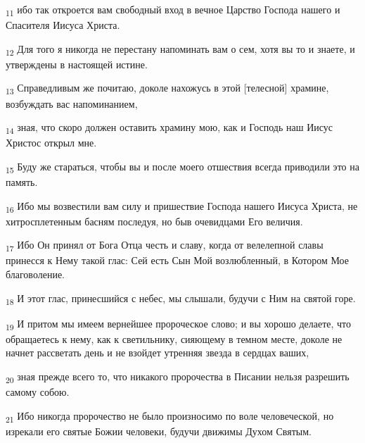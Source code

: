 \begin{tcolorbox}
\textsubscript{11} ибо так откроется вам свободный вход в вечное Царство Господа нашего и Спасителя Иисуса Христа.
\end{tcolorbox}
\begin{tcolorbox}
\textsubscript{12} Для того я никогда не перестану напоминать вам о сем, хотя вы то и знаете, и утверждены в настоящей истине.
\end{tcolorbox}
\begin{tcolorbox}
\textsubscript{13} Справедливым же почитаю, доколе нахожусь в этой [телесной] храмине, возбуждать вас напоминанием,
\end{tcolorbox}
\begin{tcolorbox}
\textsubscript{14} зная, что скоро должен оставить храмину мою, как и Господь наш Иисус Христос открыл мне.
\end{tcolorbox}
\begin{tcolorbox}
\textsubscript{15} Буду же стараться, чтобы вы и после моего отшествия всегда приводили это на память.
\end{tcolorbox}
\begin{tcolorbox}
\textsubscript{16} Ибо мы возвестили вам силу и пришествие Господа нашего Иисуса Христа, не хитросплетенным басням последуя, но быв очевидцами Его величия.
\end{tcolorbox}
\begin{tcolorbox}
\textsubscript{17} Ибо Он принял от Бога Отца честь и славу, когда от велелепной славы принесся к Нему такой глас: Сей есть Сын Мой возлюбленный, в Котором Мое благоволение.
\end{tcolorbox}
\begin{tcolorbox}
\textsubscript{18} И этот глас, принесшийся с небес, мы слышали, будучи с Ним на святой горе.
\end{tcolorbox}
\begin{tcolorbox}
\textsubscript{19} И притом мы имеем вернейшее пророческое слово; и вы хорошо делаете, что обращаетесь к нему, как к светильнику, сияющему в темном месте, доколе не начнет рассветать день и не взойдет утренняя звезда в сердцах ваших,
\end{tcolorbox}
\begin{tcolorbox}
\textsubscript{20} зная прежде всего то, что никакого пророчества в Писании нельзя разрешить самому собою.
\end{tcolorbox}
\begin{tcolorbox}
\textsubscript{21} Ибо никогда пророчество не было произносимо по воле человеческой, но изрекали его святые Божии человеки, будучи движимы Духом Святым.
\end{tcolorbox}
